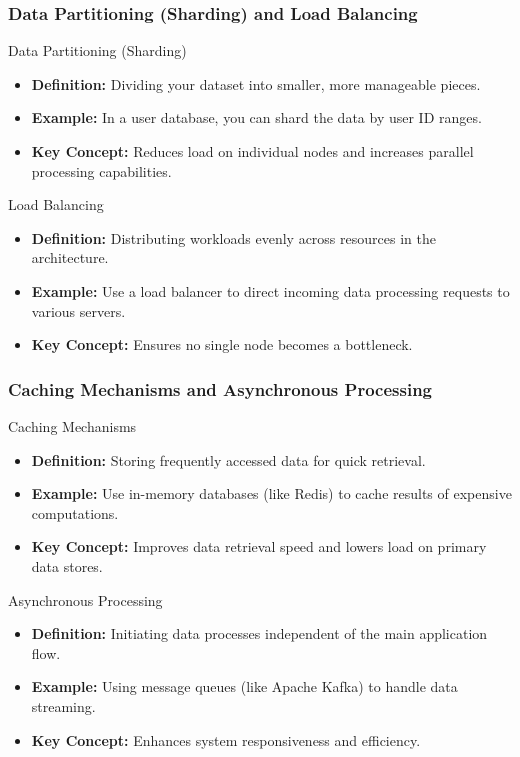 \documentclass[aspectratio=169]{beamer}
\begin{document}
\begin{frame}[fragile]
    \frametitle{Data Partitioning (Sharding) and Load Balancing}
    \begin{block}{Data Partitioning (Sharding)}
        \begin{itemize}
            \item \textbf{Definition:} Dividing your dataset into smaller, more manageable pieces.
            \item \textbf{Example:} In a user database, you can shard the data by user ID ranges.
            \item \textbf{Key Concept:} Reduces load on individual nodes and increases parallel processing capabilities.
        \end{itemize}
    \end{block}

    \begin{block}{Load Balancing}
        \begin{itemize}
            \item \textbf{Definition:} Distributing workloads evenly across resources in the architecture.
            \item \textbf{Example:} Use a load balancer to direct incoming data processing requests to various servers.
            \item \textbf{Key Concept:} Ensures no single node becomes a bottleneck.
        \end{itemize}
    \end{block}
\end{frame}

\begin{frame}[fragile]
    \frametitle{Caching Mechanisms and Asynchronous Processing}
    \begin{block}{Caching Mechanisms}
        \begin{itemize}
            \item \textbf{Definition:} Storing frequently accessed data for quick retrieval.
            \item \textbf{Example:} Use in-memory databases (like Redis) to cache results of expensive computations.
            \item \textbf{Key Concept:} Improves data retrieval speed and lowers load on primary data stores.
        \end{itemize}
    \end{block}

    \begin{block}{Asynchronous Processing}
        \begin{itemize}
            \item \textbf{Definition:} Initiating data processes independent of the main application flow.
            \item \textbf{Example:} Using message queues (like Apache Kafka) to handle data streaming.
            \item \textbf{Key Concept:} Enhances system responsiveness and efficiency.
        \end{itemize}
    \end{block}
\end{frame}
\end{document}
